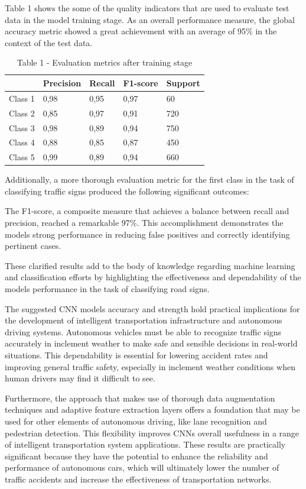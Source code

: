 \begin{multicols}{2}
Table 1 shows the some of the quality indicators that are used to
evaluate test data in the model training stage. As an overall
performance measure, the global accuracy metric showed a great
achievement with an average of 95\% in the context of the test data.

\begin{table}[H]
\caption*{Table 1 - Evaluation metrics after training stage}
\centering
\begin{tabular}{|l|l|l|l|l|}
\hline
 & Precision & Recall & F1-score & Support \\ \hline
Class 1 & 0,98 & 0,95 & 0,97 & 60 \\ \hline
Class 2 & 0,85 & 0,97 & 0,91 & 720 \\ \hline
Class 3 & 0,98 & 0,89 & 0,94 & 750 \\ \hline
Class 4 & 0,88 & 0,85 & 0,87 & 450 \\ \hline
Class 5 & 0,99 & 0,89 & 0,94 & 660 \\ \hline
\end{tabular}
\end{table}

Additionally, a more thorough evaluation metric for the first class in
the task of classifying traffic signs produced the following significant
outcomes:

The F1-score, a composite measure that achieves a balance between recall
and precision, reached a remarkable 97\%. This accomplishment
demonstrates the model\textquotesingle s strong performance in reducing
false positives and correctly identifying pertinent cases.

These clarified results add to the body of knowledge regarding machine
learning and classification efforts by highlighting the effectiveness
and dependability of the model\textquotesingle s performance in the task
of classifying road signs.

The suggested CNN model\textquotesingle s accuracy and strength hold
practical implications for the development of intelligent transportation
infrastructure and autonomous driving systems. Autonomous vehicles must
be able to recognize traffic signs accurately in inclement weather to
make safe and sensible decisions in real-world situations. This
dependability is essential for lowering accident rates and improving
general traffic safety, especially in inclement weather conditions when
human drivers may find it difficult to see.

Furthermore, the approach that makes use of thorough data augmentation
techniques and adaptive feature extraction layers offers a foundation
that may be used for other elements of autonomous driving, like lane
recognition and pedestrian detection. This flexibility improves
CNNs\textquotesingle{} overall usefulness in a range of intelligent
transportation system applications. These results are practically
significant because they have the potential to enhance the reliability
and performance of autonomous cars, which will ultimately lower the
number of traffic accidents and increase the effectiveness of
transportation networks.


\end{multicols}

